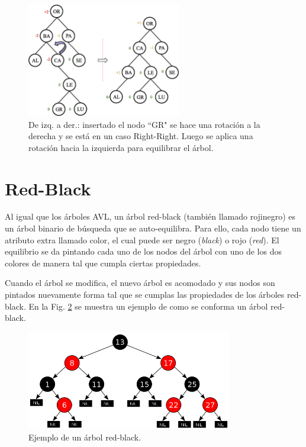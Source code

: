 \begin{figure}[htpb!]
  \begin{center}
    \includegraphics[width=0.6\textwidth]{images/AVLInsertion6.eps}
  \end{center}
  \caption{De izq. a der.: insertado el nodo ``GR" se hace una rotación a la derecha y se está en un caso Right-Right. Luego se aplica una rotación hacia la izquierda para equilibrar el árbol.}
  \label{fig:AVLInsertion6}
\end{figure}


\section{Red-Black}

Al igual que los árboles AVL, un árbol red-black (también llamado rojinegro) es un árbol binario de búsqueda que se auto-equilibra. Para ello, cada nodo tiene un atributo extra llamado color, el cual puede ser negro (\textit{black}) o rojo (\textit{red}). El equilibrio se da pintando cada uno de los nodos del árbol con uno de los dos colores de manera tal que cumpla ciertas propiedades.

Cuando el árbol se modifica, el nuevo árbol es acomodado y sus nodos son pintados nuevamente forma tal que se cumplas las propiedades de los árboles red-black. En la Fig. \ref{fig:RedBlack1} se muestra un ejemplo de como se conforma un árbol red-black.

\begin{figure}[htpb!]
  \begin{center}
    \includegraphics[width=0.8\textwidth]{images/redblack.png}
  \end{center}
  \caption{Ejemplo de un árbol red-black.}
  \label{fig:RedBlack1}
\end{figure}

